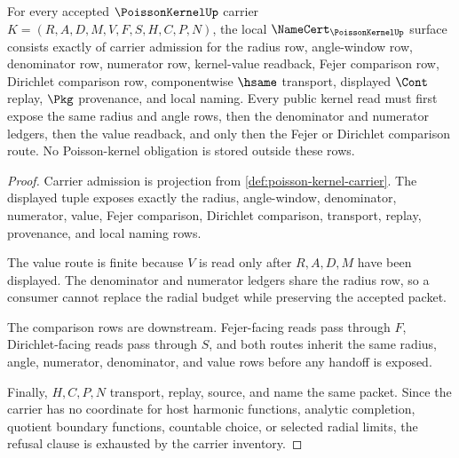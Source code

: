\begin{theorem}\label{thm:poisson-kernel-namecert-obligations}
For every accepted $\PoissonKernelUp$ carrier $K=(R,A,D,M,V,F,S,H,C,P,N)$, the local $\NameCert_{\PoissonKernelUp}$ surface consists exactly of carrier admission for the radius row, angle-window row, denominator row, numerator row, kernel-value readback, Fejer comparison row, Dirichlet comparison row, componentwise $\hsame$ transport, displayed $\Cont$ replay, $\Pkg$ provenance, and local naming. Every public kernel read must first expose the same radius and angle rows, then the denominator and numerator ledgers, then the value readback, and only then the Fejer or Dirichlet comparison route. No Poisson-kernel obligation is stored outside these rows.
\end{theorem}
\begin{proof}
Carrier admission is projection from \autoref{def:poisson-kernel-carrier}. The displayed tuple exposes exactly the radius, angle-window, denominator, numerator, value, Fejer comparison, Dirichlet comparison, transport, replay, provenance, and local naming rows.

The value route is finite because $V$ is read only after $R,A,D,M$ have been displayed. The denominator and numerator ledgers share the radius row, so a consumer cannot replace the radial budget while preserving the accepted packet.

The comparison rows are downstream. Fejer-facing reads pass through $F$, Dirichlet-facing reads pass through $S$, and both routes inherit the same radius, angle, numerator, denominator, and value rows before any handoff is exposed.

Finally, $H,C,P,N$ transport, replay, source, and name the same packet. Since the carrier has no coordinate for host harmonic functions, analytic completion, quotient boundary functions, countable choice, or selected radial limits, the refusal clause is exhausted by the carrier inventory.
\end{proof}

